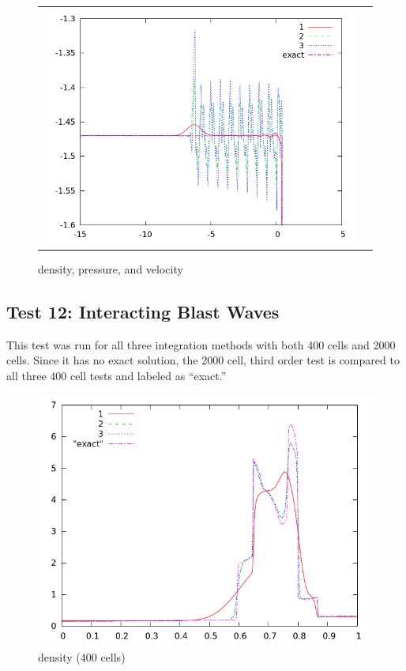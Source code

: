 \documentclass[10pt,preprint]{aastex}
\begin{document}
\begin{figure}[h]
\begin{center}
\begin{tabular}{cc}
      \includegraphics[width=.4\textwidth]{vel11zoom.png} \\
	\end{tabular}	
  \end{center}
  \caption{density, pressure, and velocity}
\end{figure}

\clearpage

\subsection{Test 12: Interacting Blast Waves}
This test was run for all three integration methods with both 400 cells and 2000 cells. Since it has no exact solution, the 2000 cell, third order test is compared to all three 400 cell tests and labeled as ``exact.''

\begin{figure}[h]
  \begin{center}
     \includegraphics[width=.78\textwidth]{den_T12_400.png}	
  \end{center}
  \caption{density (400 cells)}
\end{figure}
\end{document}
